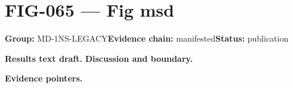 \clearpage
\section{FIG-065 --- Fig msd}
\label{figpage:fig-065}
\textbf{Group:} MD-1NS-LEGACY\quad \textbf{Evidence chain:} manifested\quad \textbf{Status:} publication

\textbf{Results text draft.} 
\textbf{Discussion and boundary.} 


\textbf{Evidence pointers.}



\vfill
